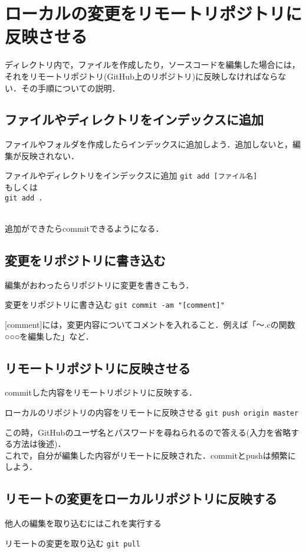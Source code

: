\documentclass{jarticle}
\begin{document}
\section{ローカルの変更をリモートリポジトリに反映させる}
ディレクトリ内で，ファイルを作成したり，ソースコードを編集した場合には，それをリモートリポジトリ(GitHub上のリポジトリ)に反映しなければならない．その手順についての説明．
\subsection{ファイルやディレクトリをインデックスに追加}
ファイルやフォルダを作成したらインデックスに追加しよう．追加しないと，編集が反映されない．
\begin{itembox}[l]{ファイルやディレクトリをインデックスに追加}
{\tt git add [ファイル名]}\\
もしくは\\
{\tt git add .}
\end{itembox}
\\
追加ができたらcommitできるようになる．
\\
\subsection{変更をリポジトリに書き込む}
編集がおわったらリポジトリに変更を書きこもう．\\
\begin{itembox}[l]{変更をリポジトリに書き込む}
  {\tt git commit -am "[comment]"}
\end{itembox}
[comment]には，変更内容についてコメントを入れること．例えば「〜.cの関数○○○を編集した」など．
\\
%
\subsection{リモートリポジトリに反映させる}
commitした内容をリモートリポジトリに反映する．\\
\begin{itembox}[l]{ローカルのリポジトリの内容をリモートに反映させる}
  {\tt git push origin master}
\end{itembox}
この時，GitHubのユーザ名とパスワードを尋ねられるので答える(入力を省略する方法は後述)．\\
これで，自分が編集した内容がリモートに反映された．commitとpushは頻繁にしよう．
%
\subsection{リモートの変更をローカルリポジトリに反映する}
他人の編集を取り込むにはこれを実行する\\
\begin{itembox}[l]{リモートの変更を取り込む}
{\tt git pull}
\end{itembox}
\end{document}
